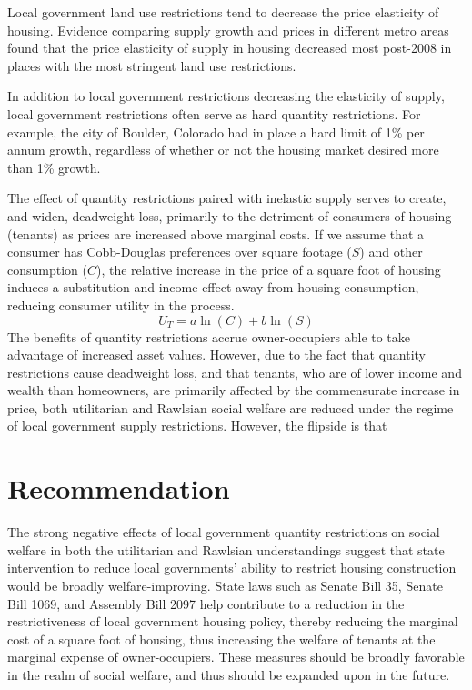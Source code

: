 \documentclass[12pt]{extarticle}
\newlength\tindent
\renewcommand{\indent}{\hspace*{\tindent}}
\begin{document}
  \indent Local government land use restrictions tend to decrease the price elasticity of housing. Evidence comparing supply growth and prices in different metro areas found that the price elasticity of supply in housing decreased most post-2008 in places with the most stringent land use restrictions.\supercite{albuquerque_2020}

  \indent In addition to local government restrictions decreasing the elasticity of supply, local government restrictions often serve as hard quantity restrictions. For example, the city of Boulder, Colorado had in place a hard limit of 1\% per annum growth,\supercite{growth_caps} regardless of whether or not the housing market desired more than 1\% growth.

  \indent The effect of quantity restrictions paired with inelastic supply serves to create, and widen, deadweight loss, primarily to the detriment of consumers of housing (tenants) as prices are increased above marginal costs. If we assume that a consumer has Cobb-Douglas preferences over square footage ($S$) and other consumption ($C$), the relative increase in the price of a square foot of housing induces a substitution and income effect away from housing consumption, reducing consumer utility in the process.
  \[U_{T} = a\ln(C) + b\ln(S)\]
  \indent The benefits of quantity restrictions accrue owner-occupiers able to take advantage of increased asset values. However, due to the fact that quantity restrictions cause deadweight loss, and that tenants, who are of lower income and wealth than homeowners,\supercite{tenant_income} are primarily affected by the commensurate increase in price, both utilitarian and Rawlsian social welfare are reduced under the regime of local government supply restrictions. However, the flipside is that 
  \section*{Recommendation}%
  \indent The strong negative effects of local government quantity restrictions on social welfare in both the utilitarian and Rawlsian understandings suggest that state intervention to reduce local governments' ability to restrict housing construction would be broadly welfare-improving. State laws such as Senate Bill 35, Senate Bill 1069, and Assembly Bill 2097 help contribute to a reduction in the restrictiveness of local government housing policy, thereby reducing the marginal cost of a square foot of housing, thus increasing the welfare of tenants at the marginal expense of owner-occupiers. These measures should be broadly favorable in the realm of social welfare, and thus should be expanded upon in the future.
  \printbibliography
\end{document}
